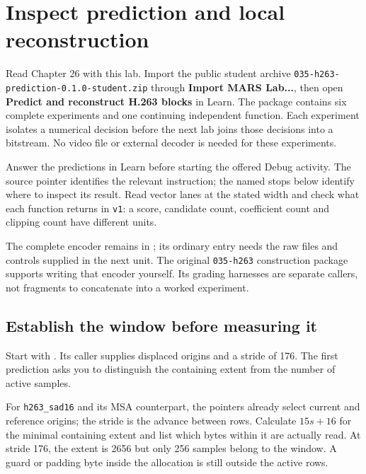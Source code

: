 \chapter{Inspect prediction and local reconstruction}
\label{revision-lab:predicting-pictures}

Read Chapter 26 with this lab. Import the public student archive
\texttt{035-h263-prediction-0.1.0-student.zip} through
\textbf{Import MARS Lab...}, then open
\textbf{Predict and reconstruct H.263 blocks} in Learn. The package contains six
complete experiments and one continuing independent function. Each experiment
isolates a numerical decision before the next lab joins those decisions into a
bitstream. No video file or external decoder is needed for these experiments.

Answer the predictions in Learn before starting the offered Debug activity.
The source pointer identifies the relevant instruction; the named stops below
identify where to inspect its result. Read vector lanes at the stated width and
check what each function returns in \texttt{v1}: a score, candidate count,
coefficient count and clipping count have different units.

The complete encoder remains in
; its ordinary entry needs the raw
files and controls supplied in the next unit. The original \texttt{035-h263}
construction package supports writing that encoder yourself. Its grading harnesses
are separate callers, not fragments to concatenate into a worked experiment.

\section{Establish the window before measuring it}

Start with . Its caller supplies displaced origins
and a stride of 176. The first prediction asks you to distinguish the containing
extent from the number of active samples.

For \texttt{h263\_sad16} and its MSA counterpart, the pointers already select
current and reference origins; the stride is the advance between rows. Calculate
$15s+16$ for the minimal containing extent and list which bytes within it are
actually read. At stride 176, the extent is 2656 but only 256 samples belong to
the window. A guard or padding byte inside the allocation is still outside the
active rows.

